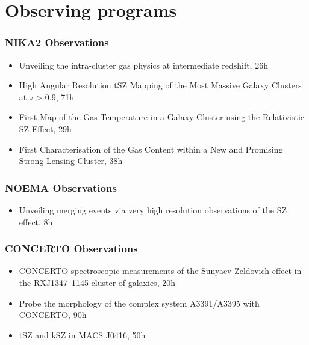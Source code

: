 \section{Observing programs}

\subsubsection{NIKA2 Observations}

\begin{itemize}[leftmargin=20pt]
    \setlength\itemsep{1pt}
    \item Unveiling the intra-cluster gas physics at intermediate redshift, 26h
    \item High Angular Resolution tSZ Mapping of the Most Massive Galaxy Clusters
        at {\it z} > 0.9, 71h
    \item First Map of the Gas Temperature in a Galaxy Cluster using the Relativistic
        SZ Effect, 29h
    \item First Characterisation of the Gas Content within a New and Promising Strong
        Lensing Cluster, 38h
\end{itemize}
\vspace{-3pt}

\subsubsection{NOEMA Observations}
\begin{itemize}[leftmargin=20pt]
    \item Unveiling merging events via very high resolution observations of the SZ effect, 8h
\end{itemize}
\vspace{-3pt}

\subsubsection{CONCERTO Observations}
\begin{itemize}[leftmargin=20pt]
    \item CONCERTO spectroscopic measurements of the Sunyaev-Zeldovich effect in the RXJ1347--1145 cluster of galaxies, 20h
    \item Probe the morphology of the complex system A3391/A3395 with CONCERTO, 90h
    \item tSZ and kSZ in MACS J0416, 50h
\end{itemize}
\vspace{-3pt}

